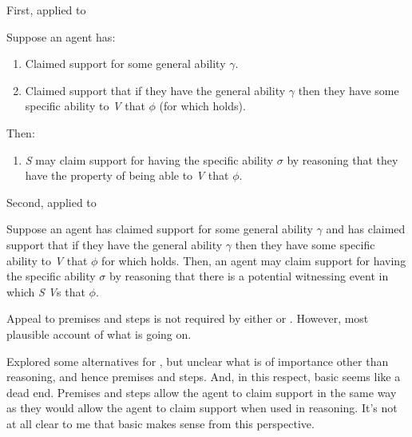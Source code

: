\begin{note}[\gsi{}++]
  First, \gsi{} applied to \AR{}
  \begin{proposition}[\textsf{|gs-I\space·\space H|}]
    Suppose an agent has:
    \begin{enumerate}
    \item Claimed support for some general ability \(\gamma\).
    \item Claimed support that if they have the general ability \(\gamma\) then they have some specific ability to \emph{V} that \(\phi\) (for which  holds).
    \end{enumerate}
    Then:
    \begin{enumerate}[resume]
    \item \emph{S} may claim support for having the specific ability \(\sigma\) by reasoning that they have the property of being able to \emph{V} that \(\phi\).
    \end{enumerate}
    \vspace{-\topsep}\vspace{-\topsep}
  \end{proposition}
  Second, \gsi{} applied to \WR{}
  \begin{proposition}\label{W:s}
        Suppose an agent has claimed support for some general ability \(\gamma\) and has claimed support that if they have the general ability \(\gamma\) then they have some specific ability to \emph{V} that \(\phi\) for which  holds.
    Then, an agent may claim support for having the specific ability \(\sigma\) by reasoning that there is a potential witnessing event in which \emph{S} \emph{V}s that \(\phi\).
  \end{proposition}
\end{note}

\begin{note}[Alternatives]
  Appeal to premises and steps is not required by either \AR{} or \WR{}.
  However, most plausible account of what is going on.

  Explored some alternatives for \AR{}, but unclear what is of importance other than reasoning, and hence premises and steps.
  And, in this respect, basic \AR{} seems like a dead end.
  Premises and steps allow the agent to claim support in the same way as they would allow the agent to claim support when used in reasoning.
  It's not at all clear to me that basic \AR{} makes sense from this perspective.
\end{note}

